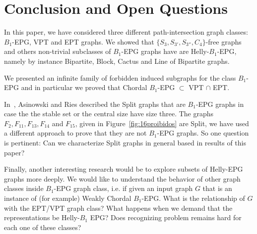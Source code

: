 \section{Conclusion and Open Questions}

In this paper, we have considered three different path-intersection graph classes: $B_1$-EPG, VPT and EPT graphs. We showed that  $\{S_3, S_{3'},S_{3''},C_4\}$-free graphs and others non-trivial subclasses of  $B_1$-EPG graphs have are Helly-$B_1$-EPG, namely by instance Bipartite, Block, Cactus and Line of Bipartite graphs. 
  
 We presented an infinite family of forbidden induced subgraphs for the class  $B_1$-EPG and in particular we proved  that Chordal $B_1$-EPG $\subset$ VPT $\cap$ EPT.  
 
 

In~\cite{ries2009}, Asinowski and Ries described the   Split graphs that are $B_1$-EPG graphs in case the the stable set  or the  central  size have size three. 
The graphs $F_2, F_{11}, F_{13}, F_{14}$ and $F_{15}$, given in Figure~\ref{fig:16proibidos} are Split, we have  used a different approach  to prove that they are not $B_1$-EPG graphs. So one question is pertinent: Can we characterize Split graphs in general based in results of this paper?

Finally, another interesting research would be to explore subsets of Helly-EPG graphs more deeply. We would like to understand the behavior of other graph classes inside $B_1$-EPG graph class, i.e. if given an  input graph $G$ that is an instance of (for example) Weakly Chordal $B_1$-EPG. What is the relationship of $G$ with the EPT/VPT graph class? What happens when we demand that the representations be Helly-$B_1$ EPG? Does  recognizing problem remains hard for each one of these classes?

 
